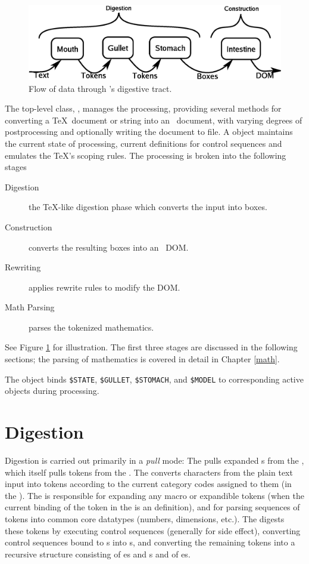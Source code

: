 \documentclass{report}
\begin{document}
\begin{figure}[tb]
\includegraphics[width=\columnwidth]{dataflow}
\caption{Flow of data through \LaTeXML's digestive tract.\label{fig:dataflow}}
\end{figure}
The top-level class, \ltxpkg{}, manages the processing, providing several methods
for converting a \TeX\ document or string into an \XML\ document, with varying degrees
of postprocessing and optionally writing the document to file.
A  object maintains the current state
of processing, current definitions for control sequences and emulates the
\TeX's scoping rules.
The processing is broken into the following stages
\begin{description}
 \item[Digestion] the \TeX-like digestion phase which converts the input into boxes.
 \item[Construction] converts the resulting boxes into an \XML\ DOM.
 \item[Rewriting] applies rewrite rules to modify the DOM.
 \item[Math Parsing] parses the tokenized mathematics.
\end{description}
See Figure \ref{fig:dataflow} for illustration.
The first three stages are discussed in the following sections;
the parsing of mathematics is covered in detail in Chapter \ref{math}.

The \ltxpkg{} object binds \verb|$STATE|, \verb|$GULLET|, \verb|$STOMACH|,
and \verb|$MODEL| to corresponding active objects during processing.

\section{Digestion}\label{architecture.digestion}
Digestion is carried out primarily in a \emph{pull} mode: The 
pulls expanded s from the , which itself pulls tokens from 
the .  The  converts characters from the plain text input
into tokens according to the current category codes assigned to them (in the ).  
The  is responsible for expanding any macro or expandible
tokens (when the current binding of the token in the  is 
an  definition), 
and for parsing sequences of tokens into common core datatypes (numbers, dimensions, etc.).
The  digests these tokens by executing  control 
sequences (generally for side effect), converting control sequences bound
to s into s, and converting the remaining tokens
into a recursive structure consisting of
es and s and of es.
\end{document}
